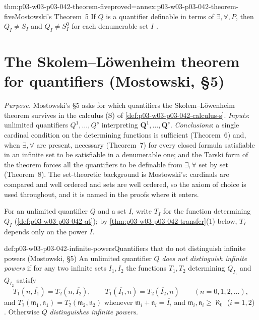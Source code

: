 \begin{hbtheorem}{thm:p03-w03-p03-042-theorem-five}{proved=annex:p03-w03-p03-042-theorem-five}{Mostowski's Theorem~5}
If \(Q\) is a quantifier definable in terms of \(\exists,\forall,P\), then
\(Q_I\neq S_I\) and \(Q_I\neq S^0_I\) for each denumerable set \(I\)
\cite[p.~20]{Mostowski1957}.
\end{hbtheorem}

\section{The Skolem--L\"owenheim theorem for quantifiers (Mostowski, \S5)}
\label{sec:p03-w03-p03-042-skolem-lowenheim}

\emph{Purpose.}  Mostowski's \S5 asks for which quantifiers the
Skolem--L\"owenheim theorem survives in the calculus (S) of
\cref{def:p03-w03-p03-042-calculus-s}.  \emph{Inputs}: unlimited
quantifiers \(Q^1,\ldots,Q^s\) interpreting \(\mathbf Q^1,\ldots,\mathbf
Q^s\).  \emph{Conclusions}: a single cardinal condition on the determining
functions is sufficient (Theorem~6) and, when \(\exists,\forall\) are
present, necessary (Theorem~7) for every closed formula satisfiable in an
infinite set to be satisfiable in a denumerable one; and the Tarski form
of the theorem forces all the quantifiers to be definable from
\(\exists,\forall\) set by set (Theorem~8).  The set-theoretic background
is Mostowski's: cardinals are compared and well ordered and sets are well
ordered, so the axiom of choice is used throughout, and it is named in the
proofs where it enters.

For an unlimited quantifier \(Q\) and a set \(I\), write \(T_I\) for the
function determining \(Q_I\) (\cref{def:p03-w03-p03-042-qt}); by
\cref{thm:p03-w03-p03-042-transfer}(1) below, \(T_I\) depends only on the
power \(\overline I\).

\begin{hbdefinition}{def:p03-w03-p03-042-infinite-powers}{Quantifiers that do not distinguish infinite powers (Mostowski, \S5)}
An unlimited quantifier \(Q\) \emph{does not distinguish infinite powers}
if for any two infinite sets \(I_1,I_2\) the functions \(T_1,T_2\)
determining \(Q_{I_1}\) and \(Q_{I_2}\) satisfy
\[
 T_1(n,\overline{I_1})=T_2(n,\overline{I_2}),\qquad
 T_1(\overline{I_1},n)=T_2(\overline{I_2},n)\qquad(n=0,1,2,\ldots),
\]
and \(T_1(\mathfrak m_1,\mathfrak n_1)=T_2(\mathfrak m_2,\mathfrak n_2)\)
whenever \(\mathfrak m_i+\mathfrak n_i=\overline{I_i}\) and
\(\mathfrak m_i,\mathfrak n_i\geq\aleph_0\) (\(i=1,2\))
\cite[p.~20]{Mostowski1957}.  Otherwise \(Q\) \emph{distinguishes
infinite powers}.
\end{hbdefinition}

